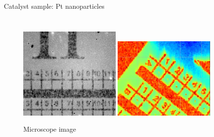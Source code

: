 \begin{frame}{Catalyst sample: Pt nanoparticles}
\begin{columns}
            \begin{figure}
                \centering %
                \includegraphics[trim=0 0 0 10, clip, width=0.45\textwidth]{Figures/sample/microscope_image.png}
                \includegraphics[width=0.45\textwidth]{Figures/sample/microscope_image_photon.png}
                \caption{Microscope image}
                \label{fig:microscope_image}
            \end{figure}
    \end{columns}

\end{frame}